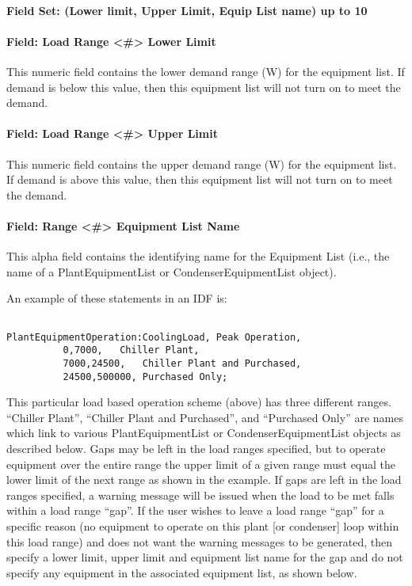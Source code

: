 \paragraph{Field Set: (Lower limit, Upper Limit, Equip List name) up to 10}\label{field-set-lower-limit-upper-limit-equip-list-name-up-to-10}

\paragraph{Field: Load Range \textless{}\#\textgreater{} Lower Limit}\label{field-load-range-lower-limit}

This numeric field contains the lower demand range (W) for the equipment list. If demand is below this value, then this equipment list will not turn on to meet the demand.

\paragraph{Field: Load Range \textless{}\#\textgreater{} Upper Limit}\label{field-load-range-upper-limit}

This numeric field contains the upper demand range (W) for the equipment list. If demand is above this value, then this equipment list will not turn on to meet the demand.

\paragraph{Field: Range \textless{}\#\textgreater{} Equipment List Name}\label{field-range-equipment-list-name}

This alpha field contains the identifying name for the Equipment List (i.e., the name of a PlantEquipmentList or CondenserEquipmentList object).

An example of these statements in an IDF is:

\begin{lstlisting}

PlantEquipmentOperation:CoolingLoad, Peak Operation,
          0,7000,   Chiller Plant,
          7000,24500,   Chiller Plant and Purchased,
          24500,500000, Purchased Only;
\end{lstlisting}

This particular load based operation scheme (above) has three different ranges. ``Chiller Plant'', ``Chiller Plant and Purchased'', and ``Purchased Only'' are names which link to various PlantEquipmentList or CondenserEquipmentList objects as described below. Gaps may be left in the load ranges specified, but to operate equipment over the entire range the upper limit of a given range must equal the lower limit of the next range as shown in the example. If gaps are left in the load ranges specified, a warning message will be issued when the load to be met falls within a load range ``gap''. If the user wishes to leave a load range ``gap'' for a specific reason (no equipment to operate on this plant {[}or condenser{]} loop within this load range) and does not want the warning messages to be generated, then specify a lower limit, upper limit and equipment list name for the gap and do not specify any equipment in the associated equipment list, as shown below.

